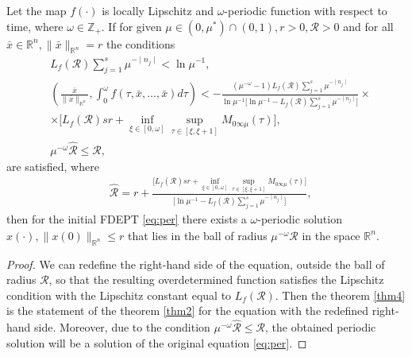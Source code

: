\documentclass[
11pt,%
tightenlines,%
twoside,%
onecolumn,%
nofloats,%
nobibnotes,%
nofootinbib,%
superscriptaddress,%
noshowpacs,%
centertags,aps]%
{revtex4}
\begin{document}
\begin{theorem}\label{thm4}
Let the map $f(\cdot)$ is locally Lipschitz and $\omega$-periodic function with respect to time, where $\omega\in\mathbb Z_+$. If for given $\mu\in(0,\mu^*)\cap(0,1), r>0, \mathcal R>0 $ and for all $\bar{x}\in \mathbb R^n,\|\bar{x}\|_{\mathbb R^n}=r$ the conditions
\begin{eqnarray*}
&L_f( \mathcal R)\sum_{j=1}^{s}\mu^{-\mid n_j \mid}<\ln \mu^{-1},\\
&\left(\frac{\bar{x}}{\|\bar{x}\|_{\mathbb R^n}},\int_0^\omega f(\tau,\bar{x},\ldots,\bar{x})d\tau\right)< - \frac{\left(\mu^{-\omega}-1 \right)L_f( \mathcal R)\sum_{j=1}^{s}\mu^{-\mid n_j \mid}}{\ln \mu^{-1}\big[\ln \mu^{-1}-L_f(\mathcal R)\sum_{j=1}^{s}\mu^{-\mid n_j \mid}\big]}\times\\
&\times \big[L_f(\mathcal R) sr +\inf_{\xi\in [0,\omega]}\sup_{\tau\in [\xi,\xi+1]}M_{0 \infty {\mu}}(\tau) \big],\\
& \mu^{-\omega}\hat{\mathcal R}\leq {\mathcal R},
\end{eqnarray*}
are satisfied, where
\begin{eqnarray*}
&\displaystyle{\hat{\mathcal R}=r+\frac{\big[L_f(\mathcal R)sr+\inf_{\xi\in [0,\omega]}\sup_{\tau\in [\xi,\xi+1]}M_{0 \infty{\mu}}(\tau)\big]}{\big[\ln \mu^{-1}-L_f(\mathcal R)\sum_{j=1}^{s}\mu^{-\mid n_j \mid}\big]}},
\end{eqnarray*}
then for the initial FDEPT \eqref{eq:per} there exists a $\omega$-periodic solution $x(\cdot),\|x(0)\|_{\mathbb R^n}\leq r$ that lies in the ball of radius $\mu^{-\omega}\hat{\mathcal R}$ in the space $\mathbb R^n$.
\end{theorem}
\begin{proof}
We can redefine the right-hand side of the equation, outside the ball of radius $\mathcal R$, so that the resulting overdetermined function satisfies the Lipschitz condition with the Lipschitz constant equal to $L_f(\mathcal R)$. Then the theorem \ref{thm4} is the statement of the theorem \ref{thm2} for the equation with the redefined right-hand side. Moreover, due to the condition $\mu^{-\omega}\hat{\mathcal R}\leq {\mathcal R}$, the obtained periodic solution will be a solution of the original equation \eqref{eq:per}.
\end{proof}
\end{document}
